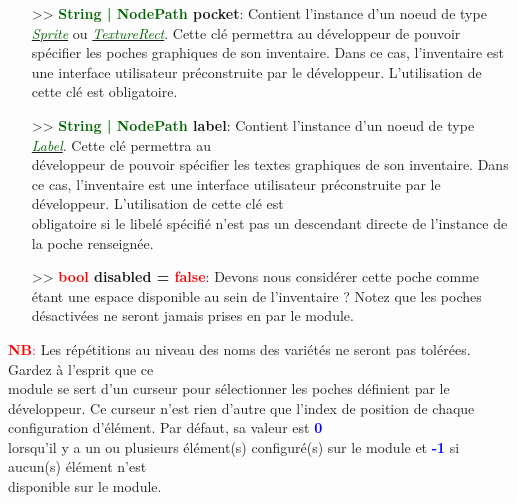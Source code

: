 \documentclass[a4paper, 11pt]{article}
\begin{document}
	\begin{itemize}
		\item[>> \textbf{\textcolor{darkgreen}{String | NodePath} pocket}:] Contient l'instance d'un noeud 
		de type \href{https://docs.godotengine.org/en/stable/classes/class_sprite.html}
		{\textit{\textcolor{darkgreen}{Sprite}}} ou
		\href{https://docs.godotengine.org/en/stable/classes/class_texturerect.html}
		{\textit{\textcolor{darkgreen}{TextureRect}}}. Cette clé permettra au développeur de 
		pouvoir spécifier les poches graphiques de son inventaire. Dans ce cas, l'inventaire est une 
		interface utilisateur préconstruite par le développeur. L'utilisation de cette clé est obligatoire.
		\\
		\item[>> \textbf{\textcolor{darkgreen}{String | NodePath} label}:] Contient l'instance d'un noeud 
		de type \href{https://docs.godotengine.org/en/stable/classes/class_label.html}
		{\textit{\textcolor{darkgreen}{Label}}}. Cette clé permettra au \\développeur de pouvoir spécifier 
		les textes graphiques de son inventaire. Dans ce cas, l'inventaire est une interface utilisateur 
		préconstruite par le développeur. L'utilisation de cette clé est \\obligatoire si le libelé spécifié
		n'est pas un descendant directe de l'instance de la poche renseignée.\\
		\item[>> \textbf{\textcolor{red}{bool} disabled = \textcolor{red}{false}}:] Devons nous considérer 
		cette poche comme étant une espace disponible au sein de l'inventaire ? Notez que les poches 
		désactivées ne seront jamais prises en par le module.\\
	\end{itemize}
	\textcolor{red}{\textbf{NB}:} Les répétitions au niveau des noms des variétés ne seront pas tolérées.
	Gardez à l'esprit que ce \\module se sert d'un curseur pour sélectionner les poches définient par le
	développeur. Ce curseur n'est rien d'autre que l'index de position de chaque configuration d'élément.
	Par défaut, sa valeur est \textbf{\textcolor{blue}{0}} \\lorsqu'il y a un ou plusieurs élément(s)
	configuré(s) sur le module et \textbf{\textcolor{blue}{-1}} si aucun(s) élément n'est \\disponible sur
	le module.

\end{document}
